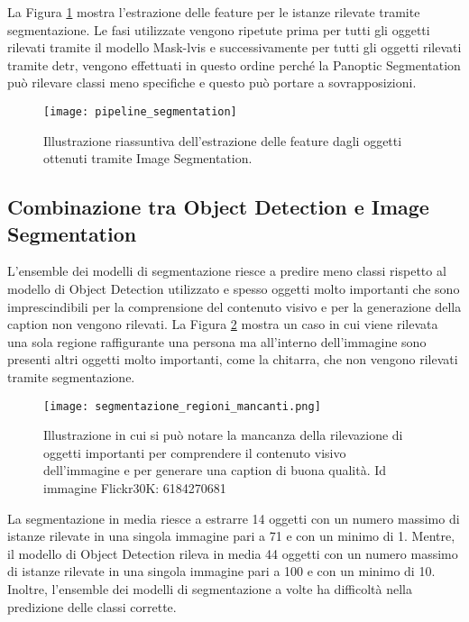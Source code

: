 La Figura \ref{figura:pipeline_segmentation} mostra l'estrazione delle feature per le istanze rilevate tramite segmentazione. Le fasi utilizzate vengono ripetute prima per tutti gli oggetti rilevati tramite il modello Mask-\acrshort{lvis} e successivamente per tutti gli oggetti rilevati tramite \acrshort{detr}, vengono effettuati in questo ordine perché la Panoptic Segmentation può rilevare classi meno specifiche e questo può portare a sovrapposizioni.
\newpage
\begin{figure}[h]
\centering
\texttt{[image: pipeline\_segmentation]}
\caption{Illustrazione riassuntiva dell'estrazione delle feature dagli oggetti ottenuti tramite Image Segmentation.}\label{figura:pipeline_segmentation}
\end{figure}

\subsection{Combinazione tra Object Detection e Image Segmentation}\label{combinazione}
L'ensemble dei modelli di segmentazione riesce a predire meno classi rispetto al modello di Object Detection utilizzato e spesso oggetti molto importanti che sono imprescindibili per la comprensione del contenuto visivo e per la generazione della caption non vengono rilevati. La Figura \ref{figura:segmentazione_regioni_mancanti} mostra un caso in cui viene rilevata una sola regione raffigurante una persona ma all'interno dell'immagine sono presenti altri oggetti molto importanti, come la chitarra, che non vengono rilevati tramite segmentazione. 
\begin{figure}[ht!]
\centering
\texttt{[image: segmentazione\_regioni\_mancanti.png]}
\caption{Illustrazione in cui si può notare la mancanza della rilevazione di oggetti importanti per comprendere il contenuto visivo dell'immagine e per generare una caption di buona qualità. Id immagine Flickr30K: 6184270681}\label{figura:segmentazione_regioni_mancanti}
\end{figure}
La segmentazione in media riesce a estrarre 14 oggetti con un numero massimo di istanze rilevate in una singola immagine pari a 71 e con un minimo di 1. Mentre, il modello di Object Detection rileva in media 44 oggetti con un numero massimo di istanze rilevate in una singola immagine pari a 100 e con un minimo di 10.
Inoltre, l'ensemble dei modelli di segmentazione a volte ha difficoltà nella predizione delle classi corrette.



